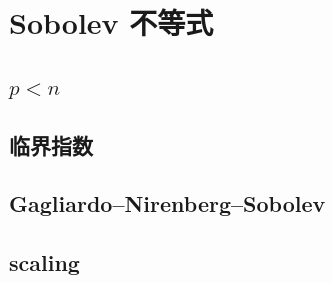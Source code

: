 \section{Sobolev 不等式}
\label{b1:sec:2402}


\subsection{\texorpdfstring{\(p<n\)}{p<n}}
\label{b1:subsec:240201}

\subsection{临界指数}
\label{b1:subsec:240202}

\subsection{Gagliardo–Nirenberg–Sobolev}
\label{b1:subsec:240203}

\subsection{scaling}
\label{b1:subsec:240204}



